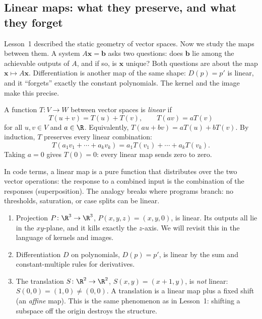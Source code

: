 
\subsection{Linear maps: what they preserve, and what they forget}

Lesson~1 described the static geometry of vector spaces. Now we study the
maps between them. A system $A\mathbf{x}=\mathbf{b}$ asks two questions:
does $\mathbf{b}$ lie among the achievable outputs of $A$, and if so, is
$\mathbf{x}$ unique? Both questions are about the map
$\mathbf{x}\mapsto A\mathbf{x}$. Differentiation is another map of the same
shape: $D(p)=p'$ is linear, and it ``forgets'' exactly the constant
polynomials. The kernel and the image make this precise.

\begin{definition}
A function $T\colon V\to W$ between vector spaces is \emph{linear} if
\[
  T(u+v)=T(u)+T(v), \qquad T(av)=aT(v)
\]
for all $u,v\in V$ and $a\in\R$. Equivalently,
$T(au+bv)=aT(u)+bT(v)$. By induction, $T$ preserves every linear
combination:
\[
  T(a_1v_1+\cdots+a_kv_k)=a_1T(v_1)+\cdots+a_kT(v_k).
\]
Taking $a=0$ gives $T(0)=0$: every linear map sends zero to zero.
\end{definition}

In code terms, a linear map is a pure function that distributes over the
two vector operations: the response to a combined input is the combination
of the responses (superposition). The analogy breaks where programs
branch: no thresholds, saturation, or case splits can be linear.

\begin{example}
\begin{enumerate}[label=(\alph*)]
  \item Projection $P\colon\R^3\to\R^3$, $P(x,y,z)=(x,y,0)$, is linear.
    Its outputs all lie in the $xy$-plane, and it kills exactly the
    $z$-axis. We will revisit this in the language of kernels and images.
  \item Differentiation $D$ on polynomials, $D(p)=p'$, is linear by the
    sum and constant-multiple rules for derivatives.
  \item The translation $S\colon\R^2\to\R^2$, $S(x,y)=(x+1,y)$, is
    \emph{not} linear: $S(0,0)=(1,0)\ne(0,0)$. A translation is a linear
    map plus a fixed shift (an \emph{affine} map). This is the same
    phenomenon as in Lesson~1: shifting a subspace off the origin
    destroys the structure.
\end{enumerate}
\end{example}

